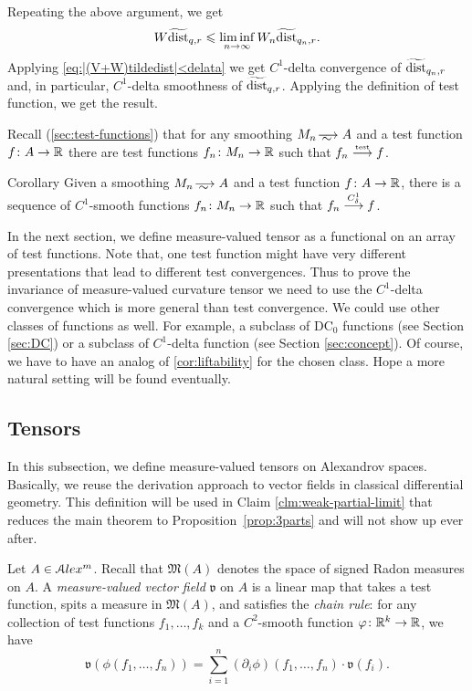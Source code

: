 Repeating the above argument, we get 
\[W\widetilde{\operatorname{\rm dist}}_{q,r}\leqslant  \liminf_{n\to\infty}W_n\widetilde{\operatorname{\rm dist}}_{q_n,r}.\]
Applying \ref{eq:|(V+W)tildedist|<delata} we get $C^1$-delta convergence of $\widetilde{\operatorname{\rm dist}}_{q_n,r}$ and, in particular, $C^1$-delta smoothness of $\widetilde{\operatorname{\rm dist}}_{q,r}$.
Applying the definition of test function, we get the result.
\qeds

Recall (\ref{sec:test-functions}) that for any smoothing $M_n\smooths{} A$ and a test function $f\colon A\to\mathbb{R}$ there are test functions  $f_n\colon M_n\to \mathbb{R}$ such that $f_n\stackrel{\text{\tiny\rm test}}{\longrightarrow} f$.

\begin{thm}{Corollary}\label{cor:liftability}
Given a smoothing $M_n\smooths{} A$ and a test function $f\colon A\to\mathbb{R}$,
there is a sequence of $C^1$-smooth functions $f_n\colon M_n\to \mathbb{R}$ such that $f_n\stackrel{C^1_\delta}{\longrightarrow} f$.
\end{thm}

In the next section, we define measure-valued tensor as a functional on an array of test functions.
Note that, one test function might have very different presentations that lead to different test convergences.
Thus to prove the invariance of measure-valued curvature tensor we need to use the $C^1$-delta convergence which is more general than test convergence.
We could use other classes of functions as well. 
For example, a subclass of DC$_0$ functions (see Section \ref{sec:DC})
or a subclass of $C^1$-delta function (see Section \ref{sec:concept}).
Of course, we have to have an analog of \ref{cor:liftability} for the chosen class.
Hope a more natural setting will be found eventually.

\subsection{Tensors}\label{subsec:tensors}

In this subsection, we define measure-valued tensors on Alexandrov spaces.
Basically, we reuse the derivation approach to vector fields in classical differential geometry.
This definition will be used in Claim \ref{clm:weak-partial-limit} that reduces the main theorem to Proposition~\ref{prop:3parts} and will not show up ever after.

Let $A\in \mathcal{A}lex^m$.
Recall that $\mathfrak M(A)$
denotes the space of signed Radon measures on $A$.
A \emph{measure-valued vector field} $\mathfrak{v}$ on $A$
is a linear map that takes a test function,
spits a measure in $\mathfrak M(A)$,
and satisfies the \emph{chain rule}:
for any collection of test functions $f_1,\dots,f_k$
and a $C^2$-smooth function $\varphi\colon\mathbb{R}^k\to\mathbb{R}$, we have
$$\mathfrak{v}(\phi(f_1,\dots,f_n))
=
\sum_{i=1}^n (\partial_i\phi)(f_1,\dots,f_n)\cdot\mathfrak{v}(f_i).
$$

